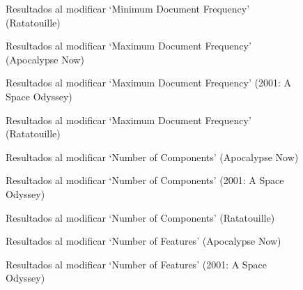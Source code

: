 \documentclass[withindex, glossary]{cam-thesis}
\begin{document}
\begin{figure}[!htbp]
    \centering
    
    \caption{Resultados al modificar `Minimum Document Frequency' (Ratatouille)}
\end{figure}

\begin{figure}[!htbp]
    \centering
    
    \caption{Resultados al modificar `Maximum Document Frequency' (Apocalypse Now)}
\end{figure}

\begin{figure}[!htbp]
    \centering
    
    \caption{Resultados al modificar `Maximum Document Frequency' (2001: A Space Odyssey)}
\end{figure}

\begin{figure}[!htbp]
    \centering
    
    \caption{Resultados al modificar `Maximum Document Frequency' (Ratatouille)}
\end{figure}

\begin{figure}[!htbp]
    \centering
    
    \caption{Resultados al modificar `Number of Components' (Apocalypse Now)}
\end{figure}

\begin{figure}[!htbp]
    \centering
    
    \caption{Resultados al modificar `Number of Components' (2001: A Space Odyssey)}
\end{figure}

\begin{figure}[!htbp]
    \centering
    
    \caption{Resultados al modificar `Number of Components' (Ratatouille)}
\end{figure}

\begin{figure}[!htbp]
    \centering
    
    \caption{Resultados al modificar `Number of Features' (Apocalypse Now)}
\end{figure}

\begin{figure}[!htbp]
    \centering
    
    \caption{Resultados al modificar `Number of Features' (2001: A Space Odyssey)}
\end{figure}
\end{document}
